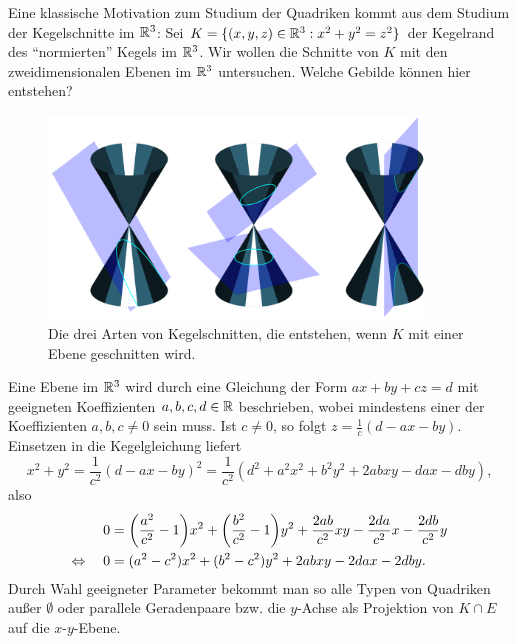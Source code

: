 \begin{beispiel}[Kegelschnitte, $n = 3$]
	\label{bsp:8.10}
	Eine klassische Motivation zum Studium der Quadriken kommt aus dem Studium der Kegelschnitte im $\mathbb{R}^3$:
	Sei $K = \{(x,y,z) \in \mathbb{R}^3 : x^2 + y^2 = z^2 \}$ der Kegelrand des \enquote{normierten} Kegels im $\mathbb{R}^3$.
	Wir wollen die Schnitte von $K$ mit den zweidimensionalen Ebenen im $\mathbb{R}^3$ untersuchen.
	Welche Gebilde können hier entstehen?
	\newpage
	
	\begin{figure}[h]
		\centering
		\includegraphics[keepaspectratio,width=10cm]{img/conic_sections.pdf}
		\caption{Die drei Arten von Kegelschnitten, die entstehen, wenn $K$ mit einer Ebene geschnitten wird. \cite{conic}}
	\end{figure}
	
	Eine Ebene im $\mathbb{R}^3$ wird durch eine Gleichung der Form $ax + by + cz = d$ mit geeigneten Koeffizienten $a,b,c,d \in \mathbb{R}$ beschrieben, wobei mindestens einer der Koeffizienten $a,b,c \neq 0$ sein muss.
	Ist $c \neq 0$, so folgt $z = \frac{1}{c} (d-ax-by)$.
	Einsetzen in die Kegelgleichung liefert
	\[
		x^2 + y^2 = \frac{1}{c^2} (d-ax-by)^2 = \frac{1}{c^2}(d^2 + a^2x^2 + b^2y^2 + 2abxy - dax - dby),
	\]
	also
	\begin{align*}
		0 &= \enb{\frac{a^2}{c^2}-1}x^2 + \enb{\frac{b^2}{c^2}-1}y^2 + \frac{2ab}{c^2} xy - \frac{2da}{c^2}x - \frac{2db}{c^2}y \\
		\Leftrightarrow \quad 0 &=(a^2-c^2)x^2 + (b^2-c^2)y^2 + 2abxy - 2dax - 2dby.
	\end{align*}
	Durch Wahl geeigneter Parameter bekommt man so alle Typen von Quadriken außer $\emptyset$ oder parallele Geradenpaare bzw. die $y$-Achse als Projektion von $K \cap E$ auf die $x$-$y$-Ebene.
\end{beispiel}

\newpage
